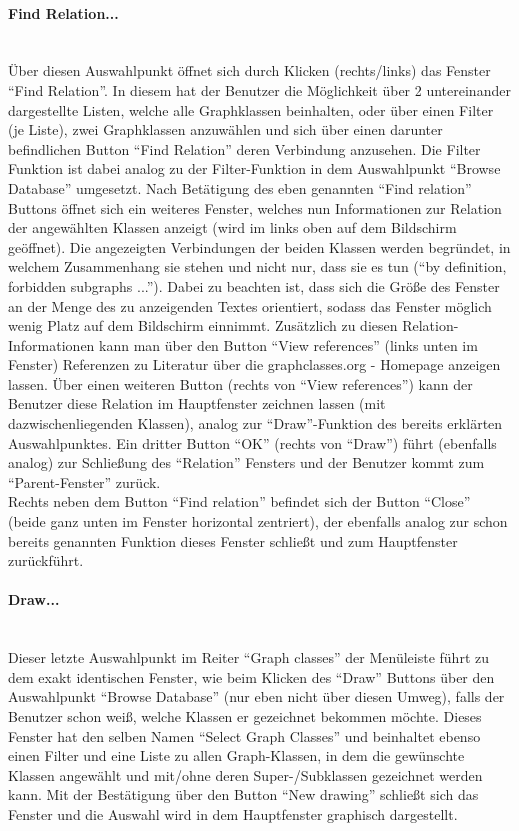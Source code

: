 \documentclass[10pt,a4paper]{article}
\begin{document}
\paragraph{Find Relation...} \ \\
Über diesen Auswahlpunkt öffnet sich durch Klicken (rechts/links) das Fenster "`Find Relation"'. In diesem hat der Benutzer die Möglichkeit über 2 untereinander dargestellte Listen, welche alle Graphklassen beinhalten, oder über einen Filter (je Liste), zwei Graphklassen anzuwählen und sich über einen darunter befindlichen Button "`Find Relation"' deren Verbindung anzusehen. Die Filter Funktion ist dabei analog zu der Filter-Funktion in dem Auswahlpunkt "`Browse Database"' umgesetzt. Nach Betätigung des eben genannten "`Find relation"' Buttons öffnet sich ein weiteres Fenster, welches nun Informationen zur Relation der angewählten Klassen anzeigt (wird im links oben auf dem Bildschirm geöffnet). Die angezeigten Verbindungen der beiden Klassen werden begründet, in welchem Zusammenhang sie stehen und nicht nur, dass sie es tun ("`by definition, forbidden subgraphs ..."'). Dabei zu beachten ist, dass sich die Größe des Fenster an der Menge des zu anzeigenden Textes orientiert, sodass das Fenster möglich wenig Platz auf dem Bildschirm einnimmt. Zusätzlich zu diesen Relation-Informationen kann man über den Button "`View references"' (links unten im Fenster) Referenzen zu Literatur über die graphclasses.org - Homepage anzeigen lassen. Über einen weiteren Button (rechts von "`View references"') kann der Benutzer diese Relation im Hauptfenster zeichnen lassen (mit dazwischenliegenden Klassen), analog zur "`Draw"'-Funktion des bereits erklärten Auswahlpunktes. Ein dritter Button "`OK"' (rechts von "`Draw"') führt (ebenfalls analog) zur Schließung des "`Relation"' Fensters und der Benutzer kommt zum "`Parent-Fenster"' zurück.\\
Rechts neben dem Button "`Find relation"' befindet sich der Button "`Close"' (beide ganz unten im Fenster horizontal zentriert), der ebenfalls analog zur schon bereits genannten Funktion dieses Fenster schließt und zum Hauptfenster zurückführt.

\paragraph{Draw...}\ \\
Dieser letzte Auswahlpunkt im Reiter "`Graph classes"' der Menüleiste führt zu dem exakt identischen Fenster, wie beim Klicken des "`Draw"' Buttons über den Auswahlpunkt "`Browse Database"' (nur eben nicht über diesen Umweg), falls der Benutzer schon weiß, welche Klassen er gezeichnet bekommen möchte. Dieses Fenster hat den selben Namen "`Select Graph Classes"' und beinhaltet ebenso einen Filter und eine Liste zu allen Graph-Klassen, in dem die gewünschte Klassen angewählt und mit/ohne deren Super-/Subklassen gezeichnet werden kann. Mit der Bestätigung über den Button "`New drawing"' schließt sich das Fenster und die Auswahl wird in dem Hauptfenster graphisch dargestellt.
\end{document}
